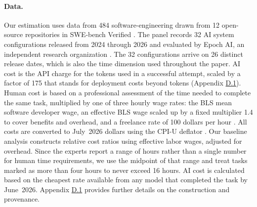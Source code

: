 \documentclass[11pt]{article}
\begin{document}
\paragraph{Data.}

Our estimation uses data from 484 software-engineering drawn
from 12 open-source repositories in SWE-bench Verified
\citep{jimenez2024,openai2024verified}. The panel records 32
AI system configurations released from 2024 through
2026 and evaluated by Epoch AI, an independent research
organization \citep{epoch2026}. The 32 configurations
arrive on 26 distinct release dates, which is also
the time dimension used throughout the paper. AI cost is the API charge
for the tokens used in a successful attempt, scaled by a factor of
175 that stands for deployment costs beyond tokens
(Appendix \href{https://ahmadlp.github.io/Lashkaripour_AI_Displacement_Online_Appendix.pdf\#page=101}{D.1}). Human cost is based on a
professional assessment of the time needed to complete the same task,
multiplied by one of three hourly wage rates: the BLS mean software
developer wage, an effective BLS wage scaled up by a fixed multiplier
1.4 to cover benefits and overhead, and a
freelance rate of 100 dollars per hour \citep{bls2024oews,bls2023ecec,upwork2026}.
All costs are converted to July~2026 dollars using the CPI-U
deflator \citep{bls2026cpi}. Our baseline analysis constructs relative
cost ratios using effective labor wages, adjusted for overhead. Since
the experts report a range of hours rather than a single number for
human time requirements, we use the midpoint of that range and treat
tasks marked as \textquotedbl more than four hours\textquotedbl{}
to never exceed 16 hours. AI cost is calculated based
on the cheapest rate available from any model that completed the task
by June~2026. Appendix \href{https://ahmadlp.github.io/Lashkaripour_AI_Displacement_Online_Appendix.pdf\#page=101}{D.1}
provides further details on the construction and provenance.
\end{document}
